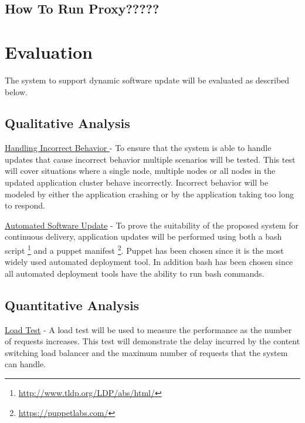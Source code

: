 \documentclass[a4paper,11pt,twoside]{article}
\begin{document}
\subsection{How To Run Proxy?????} 






























\clearpage
\section{Evaluation}
The system to support dynamic software update will be evaluated as described below.

\subsection{Qualitative Analysis}
\noindent
\underline{Handling Incorrect Behavior } - To ensure that the system is able to handle updates that cause incorrect behavior multiple scenarios will be tested. This test will cover situations where a single node, multiple nodes or all nodes in the updated application cluster behave incorrectly. Incorrect behavior will be modeled by either the application crashing or by the application taking too long to respond.

\noindent
\underline{Automated Software Update} - To prove the suitability of the proposed system for continuous delivery, application updates will be performed using both a bash script \footnote{\url{http://www.tldp.org/LDP/abs/html/}} and a puppet manifest \footnote{\url{https://puppetlabs.com/}}. Puppet has been chosen since it is the most widely used automated deployment tool. In addition bash has been chosen since all automated deployment tools have the ability to run bash commands. 


\subsection{Quantitative Analysis}
\noindent
\underline{Load Test} - A load test will be used to measure the performance as the number of requests increases. This test will demonstrate the delay incurred by the content switching load balancer and the maximum number of requests that the system can handle.
\end{document}
